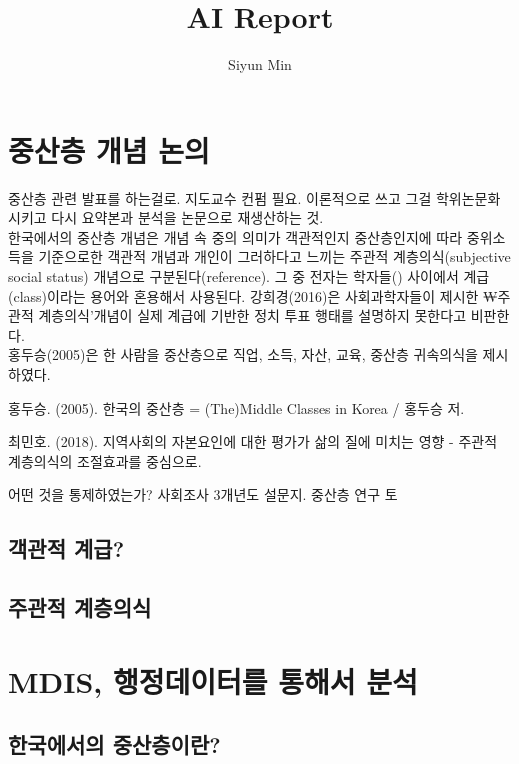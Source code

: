 \documentclass[11pt, a4paper]{article}
\begin{document}
\title{AI Report}
\author{Siyun Min}
\maketitle

\tableofcontents

\section{중산층 개념 논의}
중산층 관련 발표를 하는걸로. 지도교수 컨펌 필요. 이론적으로 쓰고 그걸 학위논문화시키고 다시 요약본과 분석을 논문으로 재생산하는 것. \\

한국에서의 중산층 개념은 개념 속 중의 의미가 객관적인지 중산층인지에 따라 중위소득을 기준으로한 객관적 개념과 개인이 그러하다고 느끼는 주관적 계층의식(subjective social status) 개념으로 구분된다(reference). 그 중 전자는 학자들() 사이에서 계급(class)이라는 용어와 혼용해서 사용된다. 강희경(2016)은 사회과학자들이 제시한 ₩주관적 계층의식'개념이 실제 계급에 기반한 정치 투표 행태를 설명하지 못한다고 비판한다. \\

홍두승(2005)은 한 사람을 중산층으로 직업, 소득, 자산, 교육, 중산층 귀속의식을 제시하였다. 

홍두승. (2005). 한국의 중산층 = (The)Middle Classes in Korea / 홍두승 저.

최민호. (2018). 지역사회의 자본요인에 대한 평가가 삶의 질에 미치는 영향 - 주관적 계층의식의 조절효과를 중심으로.

어떤 것을 통제하였는가?  사회조사 3개년도 설문지. 중산층 연구 토

\subsection{객관적 계급?}

\subsection{주관적 계층의식}



\section{MDIS, 행정데이터를 통해서 분석}


\subsection{한국에서의 중산층이란?}
\end{document}
